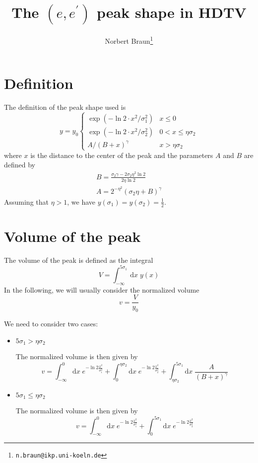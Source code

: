 \documentclass[a4paper]{article}
\begin{document}
\title{The $(e,e^\prime)$ peak shape in HDTV}
\author{Norbert Braun\thanks{\texttt{n.braun@ikp.uni-koeln.de}}}
\maketitle
\section{Definition}
The definition of the peak shape used is
\begin{equation}
y = y_0 \left\{
\begin{array}{ll}
\exp(-\ln 2 \cdot x^2/\sigma_1^2) & x \le 0\\
\exp(-\ln 2 \cdot x^2/\sigma_2^2) & 0 < x \le \eta\sigma_2\\
A / (B + x)^\gamma                & x > \eta\sigma_2
\end{array}
\right.
\end{equation}
where $x$ is the distance to the center of the peak and the parameters $A$ and $B$ are defined by
\begin{eqnarray}
B = \frac{\sigma_2\gamma - 2\sigma_2 \eta^2 \ln 2}{2 \eta \ln 2}\\
A = 2^{-\eta^2} (\sigma_2\eta + B)^\gamma
\end{eqnarray}
Assuming that $\eta > 1$, we have $y(\sigma_1) = y(\sigma_2) = \frac{1}{2}$.

\section{Volume of the peak}
The volume of the peak is defined as the integral
\begin{equation}
V = \int_{-\infty}^{5\sigma_1} \mathrm{d}x\; y(x)
\end{equation}
In the following, we will usually consider the normalized volume
\begin{equation}
v = \frac{V}{y_0}
\end{equation}

We need to consider two cases:
\begin{itemize}
\item $5\sigma_1 > \eta\sigma_2$

The normalized volume is then given by
\begin{equation}
v = \int_{-\infty}^0 \mathrm{d}x\;e^{-\ln 2 \frac{x^2}{\sigma_1^2}}
+ \int_0^{\eta\sigma_2}\mathrm{d}x\;e^{-\ln 2 \frac{x^2}{\sigma_2^2}}
+ \int_{\eta\sigma_2}^{5 \sigma_1}\mathrm{d}x\;\frac{A}{(B + x)^\gamma}
\end{equation}
\item $5\sigma_1 \le \eta\sigma_2$

The normalized volume is then given by
\begin{equation}
v = \int_{-\infty}^0 \mathrm{d}x\;e^{-\ln 2 \frac{x^2}{\sigma_1^2}}
+ \int_0^{5\sigma_1}\mathrm{d}x\;e^{-\ln 2 \frac{x^2}{\sigma_2^2}}
\end{equation}
\end{itemize}
\end{document}
